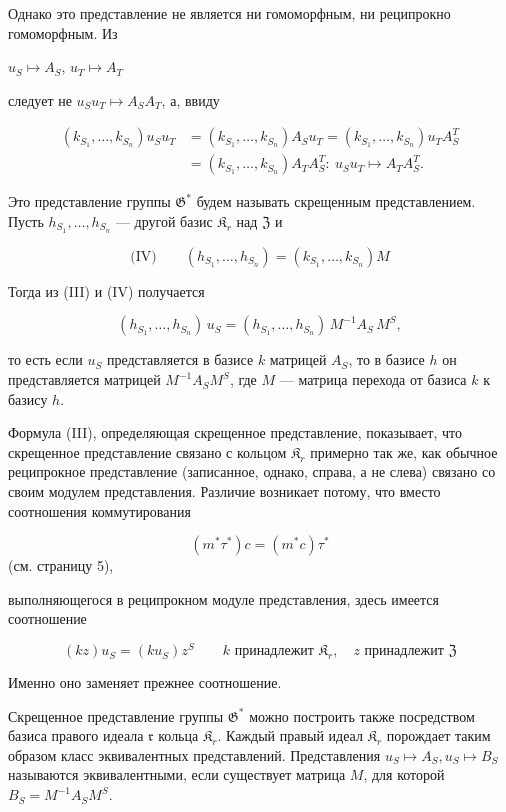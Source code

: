 \documentclass[11pt]{article}
\begin{document}
Однако это представление не является ни гомоморфным, ни реципрокно гомоморфным. Из

\(u_S \mapsto A_S\), \(u_T \mapsto A_T\)

следует не \(u_Su_T \mapsto A_SA_T\), а, ввиду

\[
\begin{aligned}
(k_{S_1}, \ldots, k_{S_n})u_Su_T
&=(k_{S_1}, \ldots, k_{S_n})A_Su_T
=(k_{S_1}, \ldots, k_{S_n})u_TA_S^T\\
&=(k_{S_1}, \ldots, k_{S_n})A_TA_S^T:\ u_Su_T\mapsto A_TA_S^T.
\end{aligned}
\]

Это представление группы \(\mathfrak{G}^*\) будем называть скрещенным представлением. Пусть \(h_{S_1}, \ldots, h_{S_n}\) --- другой базис \(\mathfrak{K}_r\) над \(\mathfrak{Z}\) и

\[
\text{(IV)}\qquad (h_{S_1}, \ldots, h_{S_n}) = (k_{S_1}, \ldots, k_{S_n})M
\]

Тогда из (III) и (IV) получается

\[(h_{S_1},\ldots,h_{S_n})\,u_S=(h_{S_1},\ldots,h_{S_n})\,M^{-1}A_S\,M^S,\]

то есть если \(u_S\) представляется в базисе \(k\) матрицей \(A_S\), то в базисе \(h\) он представляется матрицей \(M^{-1}A_SM^S\), где \(M\) --- матрица перехода от базиса \(k\) к базису \(h\).

Формула (III), определяющая скрещенное представление, показывает, что скрещенное представление связано с кольцом \(\mathfrak K_r\) примерно так же, как обычное реципрокное представление (записанное, однако, справа, а не слева) связано со своим модулем представления. Различие возникает потому, что вместо соотношения коммутирования

\[(m^*\tau^*)c = (m^*c)\tau^*\]
(см. страницу 5),

выполняющегося в реципрокном модуле представления, здесь имеется соотношение

\[
(kz)u_S=(ku_S)z^S\qquad k\text{ принадлежит }\mathfrak K_r,\quad z\text{ принадлежит }\mathfrak Z
\]

Именно оно заменяет прежнее соотношение.

Скрещенное представление группы \(\mathfrak{G}^*\) можно построить также посредством базиса правого идеала \(\mathfrak r\) кольца \(\mathfrak{K}_r\). Каждый правый идеал \(\mathfrak{K}_r\) порождает таким образом класс эквивалентных представлений. Представления \(u_S \mapsto A_S, u_S \mapsto B_S\) называются эквивалентными, если существует матрица \(M\), для которой \(B_S = M^{-1}A_SM^S\).
\end{document}
